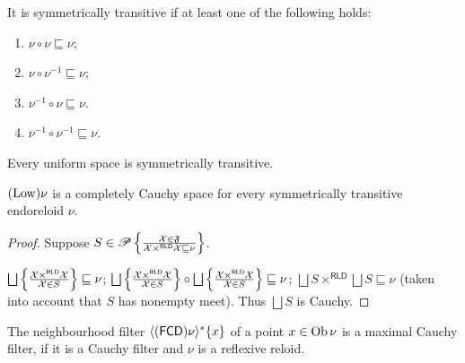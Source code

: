 \begin{obvious}
  It is symmetrically transitive if at least one of the following holds:
  \begin{enumerate}
    \item $\nu \circ \nu \sqsubseteq \nu$;
    
    \item $\nu \circ \nu^{- 1} \sqsubseteq \nu$;
    
    \item $\nu^{- 1} \circ \nu \sqsubseteq \nu$.
    
    \item $\nu^{- 1} \circ \nu^{- 1} \sqsubseteq \nu$.
  \end{enumerate}
\end{obvious}

\begin{cor}
  Every uniform space is symmetrically transitive.
\end{cor}

\begin{prop}
  $(\operatorname{Low}) \nu$ is a completely Cauchy space for every symmetrically
  transitive endoreloid $\nu$.
\end{prop}

\begin{proof}
  Suppose $S \in \mathscr{P} \left\{ \frac{ \mathcal{X} \in \mathfrak{F} }{ \mathcal{X}
  \times^{\mathsf{RLD}} \mathcal{X} \sqsubseteq \nu }\right\}$.
  
  $\bigsqcup \setcond{ \mathcal{X} \times^{\mathsf{RLD}} \mathcal{X}}
  {\mathcal{X} \in S } \sqsubseteq \nu$;
  $\bigsqcup \setcond{ \mathcal{X} \times^{\mathsf{RLD}} \mathcal{X}}
  {\mathcal{X} \in S } \circ \bigsqcup
  \setcond{ \mathcal{X} \times^{\mathsf{RLD}} \mathcal{X} }
  {\mathcal{X} \in S} \sqsubseteq \nu$; $\bigsqcup S
  \times^{\mathsf{RLD}} \bigsqcup S \sqsubseteq \nu$ (taken into
  account that $S$ has nonempty meet). Thus $\bigsqcup S$ is Cauchy.
\end{proof}

\begin{prop}
  The neighbourhood filter $\langle (\mathsf{FCD}) \nu \rangle^{\ast} \{
  x \}$ of a point $x \in \operatorname{Ob} \nu$ is a maximal Cauchy filter, if it is a
  Cauchy filter and $\nu$ is a reflexive reloid.
\end{prop}

